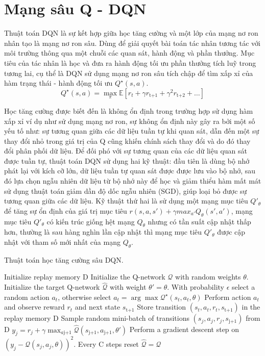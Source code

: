 \documentclass{uetgraduation}
\begin{document}
\section{Mạng sâu Q - DQN}
Thuật toán DQN là sự kết hợp giữa học tăng cường và một lớp của mạng nơ ron nhân tạo là mạng nơ ron sâu. Dùng để giải quyết bài toán tác nhân tương tác với môi trường thông qua một
chuỗi các quan sát, hành động và phần thưởng. Mục tiêu của tác nhân là học và đưa ra hành động tối ưu phần thưởng tích luỹ trong tương lai, cụ thể là DQN sử dụng mạng nơ ron sâu tích chập
để tìm xấp xỉ của hàm trạng thái - hành động tối ưu $Q^\star (s, a)$.
\begin{equation}
    Q^\star (s, a) = \max_{\pi} \mathbb{E} [r_t + \gamma r_\text{t+1} + \gamma^2 r_\text{t+2} + \dots]
\end{equation}

Học tăng cường được biết đến là không ổn định trong trường hợp sử dụng hàm xấp xỉ ví dụ như sử dụng mạng nơ ron, sự không ổn định này gây ra bởi một số yếu tố như:
sự tương quan giữa các dữ liệu tuần tự khi quan sát, dẫn đến một sự thay đổi nhỏ trong giá trị của Q cũng khiến chính sách thay đổi và do đó thay đổi phân phối dữ liệu. Để đối phó với sự
tương quan của các dữ liệu quan sát được tuần tự, thuật toán DQN sử dụng hai kỹ thuật: đầu tiên là dùng bộ nhớ phát lại với kích cỡ lớn, dữ liệu tuần tự quan sát được được lưu vào bộ nhớ, sau đó lựa chọn
ngẫu nhiên dữ liệu từ bộ nhớ này để học và giảm thiểu hàm mất mát sử dụng thuật toán giảm dần độ dốc ngẫu nhiên (SGD), giúp loại bỏ được sự tương quan giữa các dữ liệu. Kỹ thuật thứ hai là
sử dụng một mạng mục tiêu $Q'_\theta$ để tăng sự ổn định của giá trị mục tiêu $r(s, a, s') + \gamma max_{a'} Q_\theta (s', a')$, mạng mục tiêu $Q'_\theta$ có kiến trúc giống hệt mạng
$Q_\theta$ nhưng có tần suất cập nhật thấp hơn, thường là sau hàng nghìn lần cập nhật thì mạng mục tiêu $Q'_\theta$ được cập nhật với tham số mới nhất của mạng $Q_\theta$.
\begin{algorithm}
    \caption{Thuật toán học tăng cường sâu DQN.}\label{alg:dqn_2}
    \begin{algorithmic}[1]
    \State Initialize replay memory D
    \State Initialize the Q-network $\mathcal{Q}$ with random weights $\theta$.
    \State Initialize the target Q-network $\hat{\mathcal{Q}}$ with weight $\theta' = \theta$.
        \State With probability $\epsilon$ select a random action $a_t$, otherwise select $a_t = \arg \max \mathcal{Q}^\star (s_t, a_t, \theta)$
        \State Perform action $a_t$ and observe reward $r_t$ and next state $s_\text{t+1}$
        \State Store transition $(s_t,a_t,r_t,s_\text{t+1})$ in the replay memory D
        \State Sample random mini-batch of transitions $(s_j,a_j,r_j,s_\text{j+1})$ from D
        \State $y_j = r_j + \gamma \max_{a\text{j+1}} \hat{\mathcal{Q}} (s_\text{j+1}, a_\text{j+1}, \theta')$
        \State Perform a gradient descent step on $(y_j - \mathcal{Q} (s_j, a_j, \theta))^2$.
        \State Every C steps reset $\hat{\mathcal{Q}} = \mathcal{Q}$
    \EndFor
\end{algorithmic}
\end{algorithm}
\end{document}
